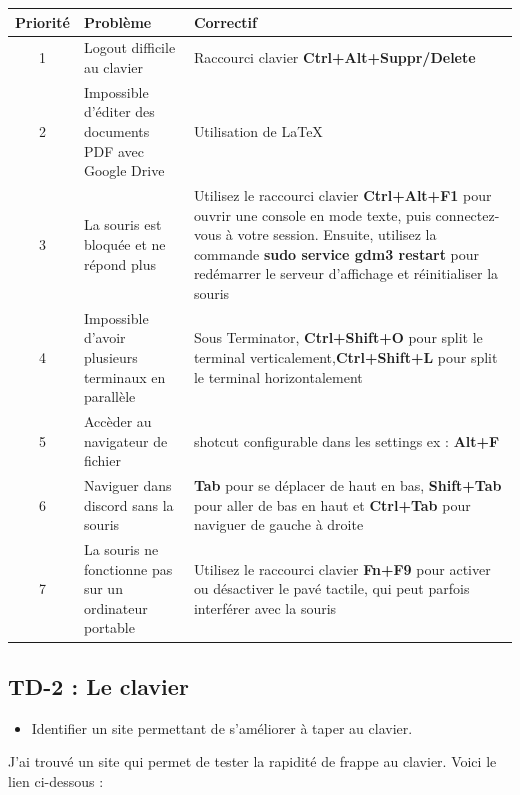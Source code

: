 \documentclass[12pt]{article}
\begin{document}
\begin{tabular}{|c|p{5cm}|p{10cm}|}
  \hline
  \textbf{Priorité} & \textbf{Problème} & \textbf{Correctif}\\
  \hline 
  1 & Logout difficile au clavier & Raccourci clavier \textbf{Ctrl+Alt+Suppr/Delete}\\
  \hline
  2 & Impossible d'éditer des documents PDF avec Google Drive & Utilisation de LaTeX\\
  \hline
  3 & La souris est bloquée et ne répond plus & Utilisez le raccourci clavier \textbf{Ctrl+Alt+F1} pour ouvrir une console en mode texte, puis connectez-vous à votre session. Ensuite, utilisez la commande \textbf{sudo service gdm3 restart} pour redémarrer le serveur d'affichage et réinitialiser la souris \\
  \hline
  4 & Impossible d'avoir plusieurs terminaux en parallèle & Sous Terminator, \textbf{Ctrl+Shift+O} pour split le terminal verticalement,\newline \textbf{Ctrl+Shift+L} pour split le terminal horizontalement\\ 
  \hline
  5 & Accèder au navigateur de fichier & shotcut configurable dans les settings ex : \textbf{Alt+F}\\
  \hline
  6 & Naviguer dans discord sans la souris & \textbf{Tab} pour se déplacer de haut en bas, \textbf{Shift+Tab} pour aller de bas en haut \newline et \textbf{Ctrl+Tab} pour naviguer de gauche à droite\\
  \hline
  7 & La souris ne fonctionne pas sur un ordinateur portable & Utilisez le raccourci clavier \textbf{Fn+F9} pour activer ou désactiver le pavé tactile, qui peut parfois interférer avec la souris \\
  \hline

\end{tabular}

\newpage

  \subsection{TD-2 : Le clavier}

\begin{itemize}
  \item Identifier un site permettant de s'améliorer à taper au clavier.
\end{itemize}

\vspace{0.3cm}

J'ai trouvé un site qui permet de tester la rapidité de frappe au clavier. Voici le lien ci-dessous  : 
\end{document}
